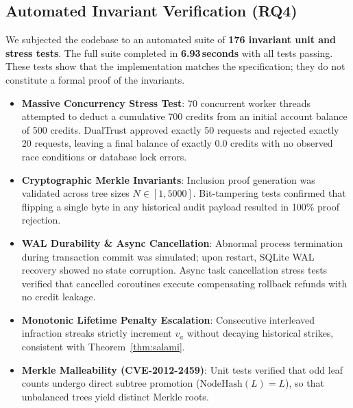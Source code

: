 \documentclass[manuscript, screen, review]{jair}
\begin{document}
\subsection{Automated Invariant Verification (RQ4)}
We subjected the codebase to an automated suite of \textbf{176 invariant unit and stress tests}. The full suite completed in \textbf{6.93\,seconds} with all tests passing. These tests show that the implementation matches the specification; they do not constitute a formal proof of the invariants.
\begin{itemize}[leftmargin=12pt, topsep=2pt, itemsep=1pt]
\item \textbf{Massive Concurrency Stress Test}: 70 concurrent worker threads attempted to deduct a cumulative 700 credits from an initial account balance of 500 credits. DualTrust approved exactly 50 requests and rejected exactly 20 requests, leaving a final balance of exactly 0.0 credits with no observed race conditions or database lock errors.
\item \textbf{Cryptographic Merkle Invariants}: Inclusion proof generation was validated across tree sizes $N \in [1, 5000]$. Bit-tampering tests confirmed that flipping a single byte in any historical audit payload resulted in 100\% proof rejection.
\item \textbf{WAL Durability \& Async Cancellation}: Abnormal process termination during transaction commit was simulated; upon restart, SQLite WAL recovery showed no state corruption. Async task cancellation stress tests verified that cancelled coroutines execute compensating rollback refunds with no credit leakage.
\item \textbf{Monotonic Lifetime Penalty Escalation}: Consecutive interleaved infraction streaks strictly increment $v_a$ without decaying historical strikes, consistent with Theorem~\ref{thm:salami}.
\item \textbf{Merkle Malleability (CVE-2012-2459)}: Unit tests verified that odd leaf counts undergo direct subtree promotion ($\text{NodeHash}(L) = L$), so that unbalanced trees yield distinct Merkle roots.
\end{itemize}
\end{document}
